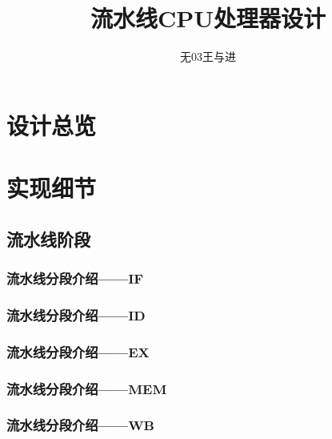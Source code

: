 \documentclass[a4paper]{article}
\begin{document}

\title{\textbf{流水线CPU处理器设计}}
\author{无03\quad 王与进 }
\date{}

\maketitle

\tableofcontents

\newpage

\section{设计总览}


\section{实现细节}

\subsection{流水线阶段}

\subsubsection{流水线分段介绍——$\mathbf{IF}$}

\subsubsection{流水线分段介绍——$\mathbf{ID}$}

\subsubsection{流水线分段介绍——$\mathbf{EX}$}

\subsubsection{流水线分段介绍——$\mathbf{MEM}$}

\subsubsection{流水线分段介绍——$\mathbf{WB}$}
\end{document}
